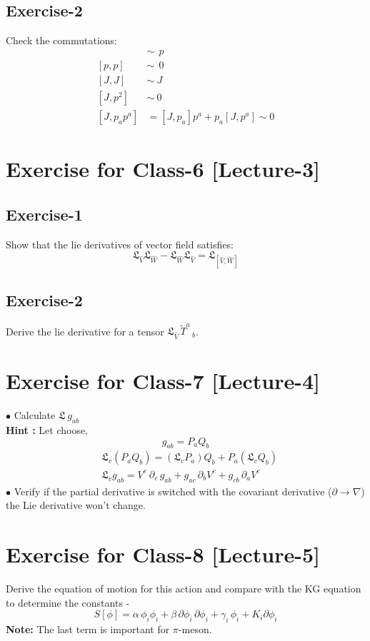 \documentclass[14pt]{article} %
\begin{document}
\subsection{Exercise-2}
Check the commutations:
\begin{align*}
    [J, p]~~ &\sim ~~p \\
    [p, p]~~ &\sim ~~0 \\
    [J, J]~~ &\sim ~J \\
    [J, p^2]~ &\sim ~0 \\
    [J, p_ap^a] &= [J, p_a]p^a + p_a[J, p^a]\sim 0
\end{align*}



\section{Exercise for Class-6 [Lecture-3]}
\subsection{Exercise-1}
Show that the lie derivatives of vector field satisfies:
\[
\mathfrak{L}_{\hat{V}} \mathfrak{L}_{\hat{W}} - \mathfrak{L}_{\hat{W}} \mathfrak{L}_{\hat{V}} = \mathfrak{L}_{[\hat{V},\hat{W}]}
\]
\subsection{Exercise-2}
Derive the lie derivative for a tensor $\mathfrak{L}_{\hat{V}}\, \tilde{T}^a\,_b $.

\section{Exercise for Class-7 [Lecture-4]}
$\bullet$ Calculate $\mathfrak{L}~g_{ab}$ \\

\textbf{Hint :} Let choose, 
\[ g_{ab} = P_a Q_b \]
\begin{align*}
& \mathfrak{L}_v (P_a Q_b) = (\mathfrak{L}_vP_a) Q_b + P_a (\mathfrak{L}_v Q_b) \\
& \mathfrak{L}_v g_{ab} = V^c~ \partial_c\, g_{ab} + g_{ac}\, \partial_b V^c + g_{cb}\, \partial_a V^c
\end{align*}
$\bullet$ Verify if the partial derivative is switched with the covariant derivative ($\partial \rightarrow\nabla$) the Lie derivative won't change.

\section{Exercise for Class-8 [Lecture-5]}
Derive the equation of motion for this action and compare with the KG equation to determine the constants -
\[
S[\phi] = \alpha\, \phi_i \phi_i + \beta\, \partial \phi_i \, \partial \phi_i + \gamma_i\, \phi_i + K_i \partial \phi_i
\]
\textbf{Note:} The last term is important for $\pi$-meson.
\end{document}
